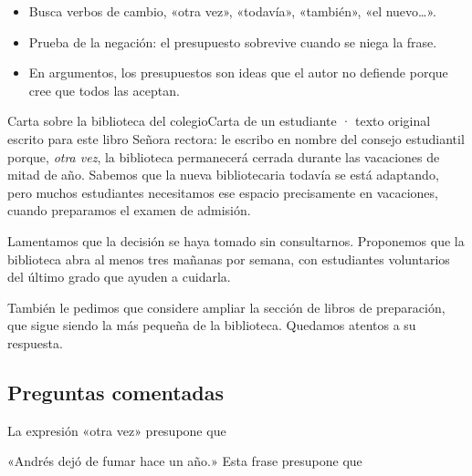 \begin{regla}
\begin{itemize}
  \item Busca verbos de cambio, «otra vez», «todavía», «también», «el nuevo…».
  \item Prueba de la negación: el presupuesto sobrevive cuando se niega la frase.
  \item En argumentos, los presupuestos son ideas que el autor no defiende porque cree que todos las aceptan.
\end{itemize}
\end{regla}

\begin{texto}{Carta sobre la biblioteca del colegio}{Carta de un estudiante · texto original escrito para este libro}
\pa Señora rectora: le escribo en nombre del consejo estudiantil porque, \emph{otra vez}, la biblioteca permanecerá cerrada
durante las vacaciones de mitad de año. Sabemos que la nueva bibliotecaria todavía se está adaptando, pero muchos
estudiantes necesitamos ese espacio precisamente en vacaciones, cuando preparamos el examen de admisión.

\pa Lamentamos que la decisión se haya tomado sin consultarnos. Proponemos que la biblioteca abra al menos tres mañanas
por semana, con estudiantes voluntarios del último grado que ayuden a cuidarla.

\pa También le pedimos que considere ampliar la sección de libros de preparación, que sigue siendo la más pequeña de la
biblioteca. Quedamos atentos a su respuesta.
\end{texto}

\subsection{Preguntas comentadas}
\begin{comentada}{La expresión «otra vez»  presupone que}
\end{comentada}

\begin{reto}
«Andrés dejó de fumar hace un año.» Esta frase presupone que
\end{reto}

